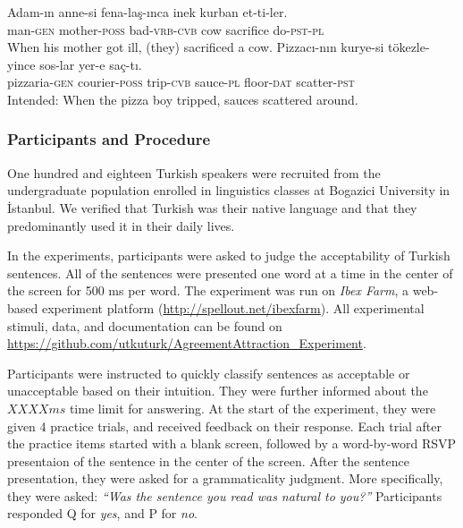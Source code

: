 \documentclass[english,doc]{apa6}
\begin{document}
\begin{exe}
\ex
\begin{xlist}
\ex \label{fillera}
\gll Adam-ın anne-si fena-la\c{s}-ınca inek kurban et-ti-ler.\\
man-\textsc{gen} mother-\textsc{poss} bad-\textsc{vrb}-\textsc{cvb} cow sacrifice do-\textsc{pst}-\textsc{pl}\\
\glt When his mother got ill, (they) sacrificed a cow.
\ex \label{fillerb}
\gll *Pizzacı-nın kurye-si tökezle-yince sos-lar yer-e saç-tı.\\
pizzaria-\textsc{gen} courier-\textsc{poss} trip-\textsc{cvb} sauce-\textsc{pl} floor-\textsc{dat} scatter-\textsc{pst}\\
\glt Intended: When the pizza boy tripped, sauces scattered around. 
\end{xlist}
\end{exe}

\hypertarget{participants-and-procedure}{%
\subsubsection{Participants and Procedure}\label{participants-and-procedure}}

One hundred and eighteen Turkish speakers were recruited from the undergraduate population enrolled in linguistics classes at Bogazici University in İstanbul. We verified that Turkish was their native language and that they predominantly used it in their daily lives.

In the experiments, participants were asked to judge the acceptability of Turkish sentences. All of the sentences were presented one word at a time in the center of the screen for 500 ms per word.
The experiment was run on \emph{Ibex Farm}, a web-based experiment platform (\url{http://spellout.net/ibexfarm}). All experimental stimuli, data, and documentation can be found on \url{https://github.com/utkuturk/AgreementAttraction_Experiment}.

Participants were instructed to quickly classify sentences as acceptable or unacceptable based on their intuition. They were further informed about the \(XXXX ms\) time limit for answering. At the start of the experiment, they were given 4 practice trials, and received feedback on their response. Each trial after the practice items started with a blank screen, followed by a word-by-word RSVP presentaion of the sentence in the center of the screen. After the sentence presentation, they were asked for a grammaticality judgment. More specifically, they were asked:
\emph{\enquote{Was the sentence you read was natural to you?}}
Participants responded Q for \emph{yes}, and P for \emph{no}.
\end{document}
